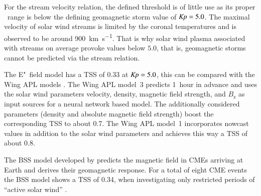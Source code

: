 For the stream velocity relation, the defined \Kp{} threshold is of little use as its proper \Kp~range is below the defining geomagnetic storm value of $\text{\textit{Kp}} = 5.0$. The maximal velocity of solar wind streams is limited by the coronal temperatures \citep{Parker1958} and is observed to be around \SI{900}{\km\per\s}. That is why solar wind plasma associated with streams on average provoke \Kp{} values below $5.0$, that is, geomagnetic storms cannot be predicted via the stream relation.

The E"~field model has a TSS of 0.33 at $\text{\textit{Kp}} = 5.0$, this can be compared with the Wing APL models \citep[Fig.~13]{Wing2005}. The Wing APL model~3 predicts \Kp{} 1~hour in advance and uses the solar wind parameters velocity, density, magnetic field strength, and $B_\text{z}$ as input sources for a neural network based model.
\pagebreak
The additionally considered parameters (density and absolute magnetic field strength) boost the corresponding TSS to about 0.7. The Wing APL model~1 incorporates \Kp{} nowcast values in addition to the solar wind parameters and achieves this way a TSS of about 0.8.

The BSS model developed by \citet{Savani2015,Savani2017} predicts the magnetic field in CMEs arriving at Earth and derives their geomagnetic response. For a total of eight CME events the BSS model shows a TSS of 0.34, when investigating only restricted periods of ``active solar wind'' \citep[Tab.~3]{Savani2017}.


